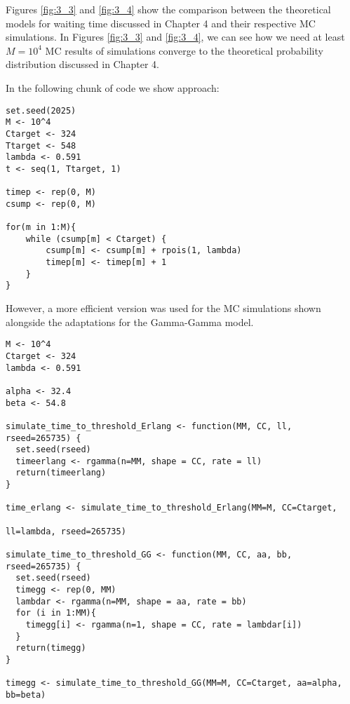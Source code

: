 Figures \ref{fig:3_3} and \ref{fig:3_4} show the comparison between the theoretical models for waiting time discussed in Chapter 4 and their respective MC simulations. In Figures \ref{fig:3_3} and \ref{fig:3_4}, we can see how we need at least $M=10^4$ MC results of simulations converge to the theoretical probability distribution discussed in Chapter 4.

In the following chunk of code we show \cite{carter2004application} approach:

\begin{knitrout}
\color{fgcolor}\begin{kframe}
\begin{verbatim}
set.seed(2025)
M <- 10^4
Ctarget <- 324
Ttarget <- 548
lambda <- 0.591
t <- seq(1, Ttarget, 1)

timep <- rep(0, M)
csump <- rep(0, M)

for(m in 1:M){
	while (csump[m] < Ctarget) {
		csump[m] <- csump[m] + rpois(1, lambda)
		timep[m] <- timep[m] + 1
	}
}
\end{verbatim}
\end{kframe}
\end{knitrout}

However, a more efficient version was used for the MC simulations shown alongside the adaptations for the Gamma-Gamma model.

\begin{knitrout}
\color{fgcolor}\begin{kframe}
\begin{verbatim}
M <- 10^4
Ctarget <- 324
lambda <- 0.591

alpha <- 32.4
beta <- 54.8

simulate_time_to_threshold_Erlang <- function(MM, CC, ll, rseed=265735) {
  set.seed(rseed)
  timeerlang <- rgamma(n=MM, shape = CC, rate = ll)
  return(timeerlang)
}

time_erlang <- simulate_time_to_threshold_Erlang(MM=M, CC=Ctarget, 
																								 ll=lambda, rseed=265735)

simulate_time_to_threshold_GG <- function(MM, CC, aa, bb, rseed=265735) {
  set.seed(rseed)
  timegg <- rep(0, MM)
  lambdar <- rgamma(n=MM, shape = aa, rate = bb)
  for (i in 1:MM){
    timegg[i] <- rgamma(n=1, shape = CC, rate = lambdar[i])
  }
  return(timegg)
}

timegg <- simulate_time_to_threshold_GG(MM=M, CC=Ctarget, aa=alpha, bb=beta) 
\end{verbatim}
\end{kframe}
\end{knitrout}

